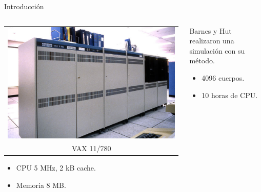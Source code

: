 \documentclass[handout]{beamer}
\begin{document}
\begin{frame}{Introducci\'on}
	\begin{columns}
		\begin{column}{.5\textwidth}
			\begin{tabular}{c}
				\includegraphics[width=\textwidth]{sources/images/DEC-VAX-11-780} \\
				VAX 11/780
			\end{tabular}
			\begin{itemize}
				\item CPU 5 MHz, 2 kB cache.
				\item Memoria 8 MB.
			\end{itemize}
		\end{column}
		\begin{column}{.5\textwidth}
			Barnes y Hut realizaron una simulaci\'on con su m\'etodo.
			\begin{itemize}
				\item<2-> 4096 cuerpos.
				\item<3-> 10 horas de CPU.
			\end{itemize}
		\end{column}
	\end{columns}
\end{frame}
\end{document}
